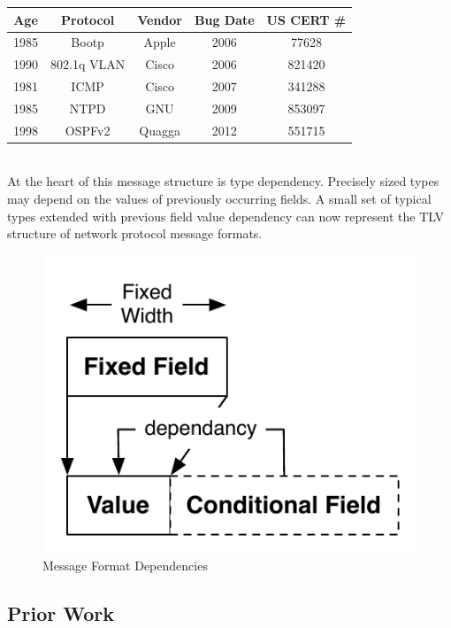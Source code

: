\begin{tabular}{|c|c|c|c|c|}
   \hline
   Age & Protocol & Vendor & Bug Date & US CERT \# \\ \hline
   \hline
   1985 & Bootp & Apple & 2006 & 77628 \\ \hline
   1990 & 802.1q VLAN & Cisco & 2006 & 821420 \\ \hline
   1981 & ICMP & Cisco & 2007 & 341288 \\ \hline
   1985 & NTPD & GNU & 2009 & 853097 \\ \hline
   1998 & OSPFv2 & Quagga & 2012 & 551715 \\ \hline
\end{tabular} \\

At the heart of this
message structure is type dependency. Precisely sized types may depend on the
values of previously occurring fields. A small set of typical types
extended with previous field value dependency can now represent the TLV
structure of network protocol message formats.

\begin{figure}[h]
   \begin{center}
   \includegraphics[width=.40\textwidth]{figs/fig1.pdf}
   \caption{Message Format Dependencies}
   \label{figure:fig1}
   \end{center}
\end{figure}

\subsection{Prior Work}

